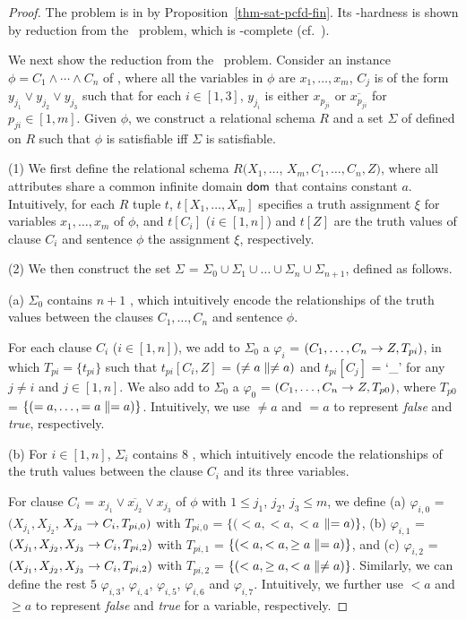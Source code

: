 \begin{proof} The problem is in \NP by
Proposition~\ref{thm-sat-pcfd-fin}. Its \NP-hardness is shown by
reduction from the \kSAT\ problem, which is \NP-complete
(cf.~\cite{GaJo79}).

We next show the reduction from the \kSAT\ problem. Consider an instance $\phi = C_1 \land \cdots
\land C_n$ of \kSAT, where all the variables in $\phi$ are $x_1,
\ldots, x_m$, $C_j$ is of the form $y_{j_1} \lor y_{j_2} \lor
y_{j_3}$ such that for each $i\in[1,3]$, $y_{j_i}$ is either
$x_{p_{ji}}$ or $\overline{x_{p_{ji}}}$ for $p_{ji} \in [1, m]$.
Given $\phi$, we construct a relational schema $R$ and a set $\Sigma$
of \pCFDs defined on $R$ such that $\phi$ is satisfiable iff
$\Sigma$ is satisfiable.

\sstab (1) We first define the relational schema $R$$(X_1, \ldots$, $X_m, C_1, \ldots,
C_n, Z)$, where all attributes share a common infinite domain $\protect\mathsf{dom}$ that contains constant $a$.
Intuitively, for each $R$ tuple $t$, $t[X_1, \ldots, X_m]$ specifies a truth assignment $\xi$ for variables
$x_1, \ldots, x_m$ of $\phi$, and $t[C_i]$ ($i\in[1, n]$) and $t[Z]$ are the truth
values of clause $C_i$ and sentence $\phi$ \wrt the assignment $\xi$, respectively.

\sstab (2) We then construct the set \pCFDs $\Sigma$ =
$\Sigma_0\cup\Sigma_1\cup\ldots\cup\Sigma_n\cup\Sigma_{n+1}$, defined as follows.

\bi
\item[(a)] $\Sigma_0$ contains $n + 1$ \pCFDs, which intuitively
encode the relationships of the truth values  between the clauses $C_1,
\ldots, C_n$ and  sentence $\phi$.

For each clause $C_i$ ($i\in[1, n]$), we add to $\Sigma_0$ a \pCFD $\varphi_i$ =
$(C_1,\ldots, C_n\rightarrow Z, T_{pi})$, in which $T_{pi} = \{t_{pi}\}$ such that
$t_{pi}[C_i,Z]$ = $(\ne a \parallel \ne a)$ and $t_{pi}[C_j]$ = `\_'
for any $j\ne i$ and $j\in[1, n]$. We also add to $\Sigma_0$ a \pCFD $\varphi_{0}$ =
$(C_1,\ldots, C_n\rightarrow Z, T_{p0})$, where $T_{p0}$ = $\{(= a, \ldots,
=a \parallel = a)\}$. Intuitively, we use $\ne a$ and $= a$ to represent
{\em false} and {\em true}, respectively.

\item[(b)]  For $i\in[1, n]$, $\Sigma_i$ contains $8$ \pCFDs, which intuitively
encode the relationships of the truth values between the clause $C_i$ and its three
variables.

For clause $C_i$ = $x_{j_1} \lor \overline{x_{j_2}} \lor
x_{j_3}$ of $\phi$ with $1\le j_1$, $j_2$, $j_3 \le m$, we define
\pCFDs
(a) $\varphi_{i,0}$ = $(X_{j_1}, X_{j_2}$, $X_{j_3}\rightarrow C_i, T_{pi,0})$ with $T_{pi,0}$ = $\{(< a, < a, <a$ $\parallel = a)\}$,
(b) $\varphi_{i,1}$ = $(X_{j_1},X_{j_2},X_{j_3}\rightarrow C_i, T_{pi,2})$ with $T_{pi,1}$ = $\{(< a, <a, \ge  a \parallel =a)\}$,  and
(c) $\varphi_{i,2}$ = $(X_{j_1},X_{j_2},X_{j_3}\rightarrow C_i, T_{pi,2})$ with $T_{pi,2}$ = $\{(< a, \ge a, < a \parallel \ne a)\}$.
Similarly, we can define the rest $5$ \pCFDs $\varphi_{i,3}$, $\varphi_{i,4}$,
$\varphi_{i,5}$, $\varphi_{i,6}$ and $\varphi_{i,7}$. Intuitively,
we further use $<a$ and $\ge a$ to represent {\em false} and {\em true} for
a variable, respectively.


\end{proof}
